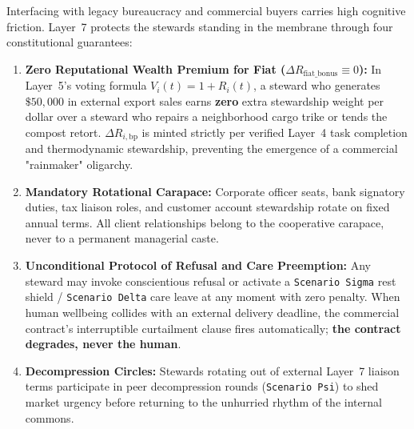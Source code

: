 Interfacing with legacy bureaucracy and commercial buyers carries high cognitive friction. Layer~7 protects the stewards standing in the membrane through four constitutional guarantees:
\begin{enumerate}
    \item \textbf{Zero Reputational Wealth Premium for Fiat ($\Delta R_{\mathrm{fiat\_bonus}} \equiv 0$):} In Layer~5's voting formula $V_i(t) = 1 + R_i(t)$, a steward who generates $\$50{,}000$ in external export sales earns \textbf{zero} extra stewardship weight per dollar over a steward who repairs a neighborhood cargo trike or tends the compost retort. $\Delta R_{i,\mathrm{bp}}$ is minted strictly per verified Layer~4 task completion and thermodynamic stewardship, preventing the emergence of a commercial "rainmaker" oligarchy.
    \item \textbf{Mandatory Rotational Carapace:} Corporate officer seats, bank signatory duties, tax liaison roles, and customer account stewardship rotate on fixed annual terms. All client relationships belong to the cooperative carapace, never to a permanent managerial caste.
    \item \textbf{Unconditional Protocol of Refusal and Care Preemption:} Any steward may invoke conscientious refusal or activate a \texttt{Scenario Sigma} rest shield / \texttt{Scenario Delta} care leave at any moment with zero penalty. When human wellbeing collides with an external delivery deadline, the commercial contract's interruptible curtailment clause fires automatically; \textbf{the contract degrades, never the human}.
    \item \textbf{Decompression Circles:} Stewards rotating out of external Layer~7 liaison terms participate in peer decompression rounds (\texttt{Scenario Psi}) to shed market urgency before returning to the unhurried rhythm of the internal commons.
\end{enumerate}
